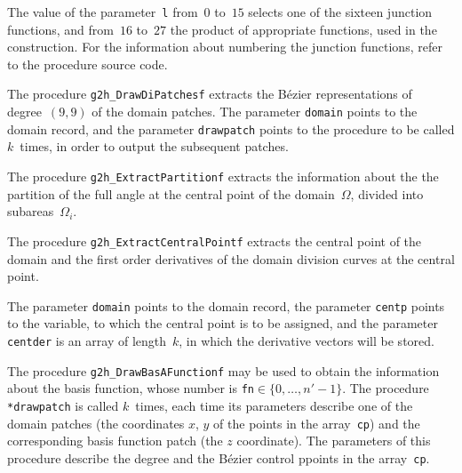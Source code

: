 The value of the parameter~\texttt{l} from~$0$ to~$15$ selects one of the
sixteen junction functions, and from~$16$ to~$27$ the product of appropriate
functions, used in the construction. For the information about numbering
the junction functions, refer to the procedure source code.

\vspace{\bigskipamount}
\begin{sloppypar}
The procedure \texttt{g2h\_DrawDiPatchesf} extracts the B\'{e}zier
representations of degree~$(9,9)$ of the domain patches. The parameter
\texttt{domain} points to the domain record, and the parameter
\texttt{drawpatch} points to the procedure to be called $k$~times,
in order to output the subsequent patches.%
\end{sloppypar}

\vspace{\bigskipamount}
The procedure \texttt{g2h\_ExtractPartitionf} extracts the information
about the the partition of the full angle at the central point of the
domain~$\varOmega$, divided into subareas~$\varOmega_i$.

\vspace{\bigskipamount}
The procedure \texttt{g2h\_ExtractCentralPointf} extracts the central point
of the domain and the first order derivatives of the domain division curves
at the central point.

The parameter \texttt{domain} points to the domain record, the parameter
\texttt{centp} points to the variable, to which the central point is to be
assigned, and the parameter \texttt{centder} is an array of length~$k$,
in which the derivative vectors will be stored.

\vspace{\bigskipamount}
The procedure \texttt{g2h\_DrawBasAFunctionf} may be used to obtain the
information about the basis function, whose number is
\texttt{fn}$\in\{0,\ldots,n'-1\}$. The procedure
\texttt{*drawpatch} is called $k$~times, each time its parameters describe
one of the domain patches (the coordinates $x$, $y$ of the points in the
array~\texttt{cp}) and the corresponding basis function patch
(the $z$ coordinate). The parameters of this procedure describe the degree
and the B\'{e}zier control ppoints in the array~\texttt{cp}.

